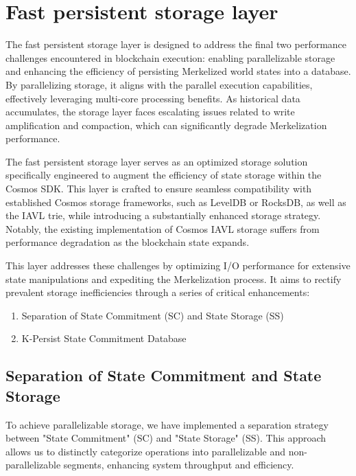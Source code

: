 \section{Fast persistent storage layer}

The fast persistent storage layer is designed to address the final two performance challenges encountered in blockchain execution: enabling parallelizable storage and enhancing the efficiency of persisting Merkelized world states into a database. By parallelizing storage, it aligns with the parallel execution capabilities, effectively leveraging multi-core processing benefits. As historical data accumulates, the storage layer faces escalating issues related to write amplification and compaction, which can significantly degrade Merkelization performance.

The fast persistent storage layer serves as an optimized storage solution specifically engineered to augment the efficiency of state storage within the Cosmos SDK. This layer is crafted to ensure seamless compatibility with established Cosmos storage frameworks, such as LevelDB or RocksDB, as well as the IAVL trie, while introducing a substantially enhanced storage strategy. Notably, the existing implementation of Cosmos IAVL storage suffers from performance degradation as the blockchain state expands.

This layer addresses these challenges by optimizing I/O performance for extensive state manipulations and expediting the Merkelization process. It aims to rectify prevalent storage inefficiencies through a series of critical enhancements:

\begin{enumerate}
    \item Separation of State Commitment (SC) and State Storage (SS)
    \item K-Persist State Commitment Database
\end{enumerate}

\subsection{Separation of State Commitment and State Storage}

To achieve parallelizable storage, we have implemented a separation strategy between "State Commitment" (SC) and "State Storage" (SS). This approach allows us to distinctly categorize operations into parallelizable and non-parallelizable segments, enhancing system throughput and efficiency.

